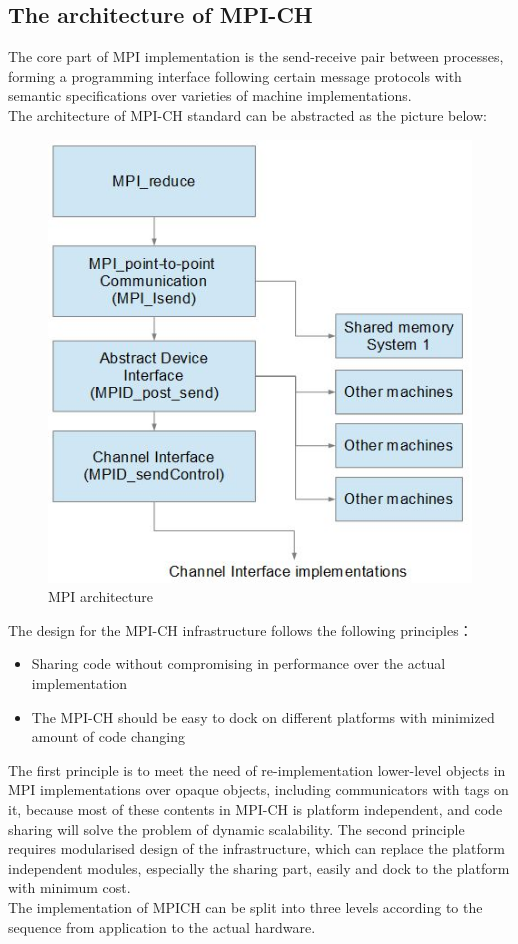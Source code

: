 \documentclass[11pt,openright,a4paper]{report}
\begin{document}
\subsection{The architecture of MPI-CH}
The core part of MPI implementation is the send-receive pair between processes, forming a programming interface following certain message protocols with semantic specifications over varieties of machine implementations.\\
The architecture of MPI-CH standard can be abstracted as the picture below:
\begin{figure}[H]
\centering
\includegraphics[width=0.6\linewidth]{picture/MPIarchitecture}
\caption{MPI architecture}
\label{fig:MPIarchitecture}
\end{figure}
The design for the MPI-CH infrastructure follows the following principles\cite{gropp1996high}：
\begin{itemize}
	\item Sharing code without compromising in performance over the actual implementation
	\item The MPI-CH should be easy to dock on different platforms with minimized amount of code changing
\end{itemize}
The first principle is to meet the need of re-implementation lower-level objects in MPI implementations over opaque objects, including communicators with tags on it, because most of these contents in MPI-CH is platform independent, and code sharing will solve the problem of dynamic scalability. The second principle requires modularised design of the infrastructure, which can replace the platform independent modules, especially the sharing part, easily and dock to the platform with minimum cost.\\
The implementation of MPICH can be split into three levels according to the sequence from application to the actual hardware.\\
\end{document}
